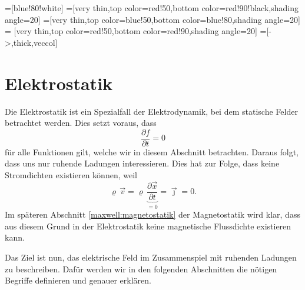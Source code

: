 %
%
%
%

\tikzset{>=latex} %
\usetikzlibrary {arrows.meta}
\pgfplotsset{compat=1.13}
\usetikzlibrary{decorations.markings,intersections,calc}
\usetikzlibrary{angles,quotes} %
=[blue!80!white]
=[very thin,top color=red!50,bottom color=red!90!black,shading angle=20]
=[very thin,top color=blue!50,bottom color=blue!80,shading angle=20]
 = [very thin,top color=red!50,bottom color=red!90,shading angle=20]
=[->,thick,veccol]


\section{Elektrostatik\label{maxwell:section:elekktrostatik}}
Die Elektrostatik ist ein Spezialfall der Elektrodynamik, bei dem statische Felder betrachtet werden.
Dies setzt voraus, dass
\begin{equation}
	\frac{\partial f}{\partial t}
	=
	0
	\label{maxwell:section:definition_statik}
\end{equation}
für alle Funktionen gilt, welche wir in diesem Abschnitt betrachten.
Daraus folgt, dass uns nur ruhende Ladungen interessieren.
Dies hat zur Folge, dass keine Stromdichten existieren können, weil
\begin{equation}
	\varrho\,\vec{v}
	=
	\varrho\, \underbrace{\frac{\partial \vec{x}}{\partial t}}_{=0}
	=
	\vec{\jmath}
	=
	0.
\end{equation}
Im späteren Abschnitt \ref{maxwell:magnetostatik} der Magnetostatik wird klar, dass aus diesem Grund in der Elektrostatik keine magnetische Flussdichte existieren kann.
 
Das Ziel ist nun, das elektrische Feld im Zusammenspiel mit ruhenden Ladungen zu beschreiben.
Dafür werden wir in den folgenden Abschnitten die nötigen Begriffe definieren und genauer erklären.

